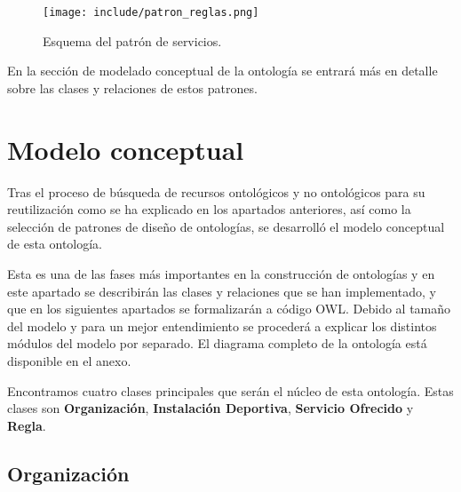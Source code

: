 \documentclass[a4paper,12pt]{article}
\begin{document}
	\begin{figure}[H]
		\centering
		\texttt{[image: include/patron\_reglas.png]}
		\caption{Esquema del patrón de servicios.}
	\end{figure}
	
	En la sección de modelado conceptual de la ontología se entrará más en detalle sobre las clases y relaciones de estos patrones.
	
	\section{Modelo conceptual}
	
	Tras el proceso de búsqueda de recursos ontológicos y no ontológicos para su reutilización como se ha explicado en los apartados anteriores, así como la selección de patrones de diseño de ontologías, se desarrolló el modelo conceptual de esta ontología. 
	
	Esta es una de las fases más importantes en la construcción de ontologías y en este apartado se describirán las clases y relaciones que se han implementado, y que en los siguientes apartados se formalizarán a código OWL. Debido al tamaño del modelo y para un mejor entendimiento se procederá a explicar los distintos módulos del modelo por separado. El diagrama completo de la ontología está disponible en el anexo.
	
	Encontramos cuatro clases principales que serán el núcleo de esta ontología. Estas clases son \textbf{Organización}, \textbf{Instalación Deportiva}, \textbf{Servicio Ofrecido} y \textbf{Regla}.
	
	
	\subsection{Organización}
	
\end{document}

